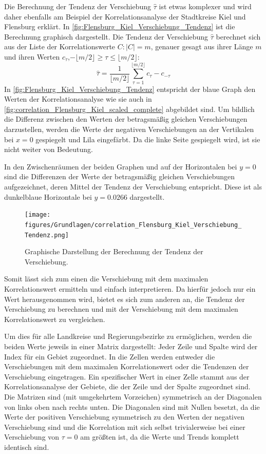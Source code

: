 Die Berechnung der Tendenz der Verschiebung $\hat{\tau}$ ist etwas komplexer und wird daher ebenfalls am Beispiel der Korrelationsanalyse der Stadtkreise Kiel und Flensburg erklärt.
In \autoref{fig:Flensburg_Kiel_Verschiebung_Tendenz} ist die Berechnung graphisch dargestellt.
Die Tendenz der Verschiebung $\hat{\tau}$ berechnet sich aus der Liste der Korrelationswerte $C:\vert C\vert =m$, genauer gesagt aus ihrer Länge $m$ und ihren Werten $c_\tau$,$ -\lfloor m/2 \rfloor\geq \tau\leq \lfloor m/2 \rfloor$:
\begin{equation}\label{eq:Tendenz der Verschiebung}
    \hat{\tau} = \frac{1}{\lfloor m/2 \rfloor}
    \sum_{\tau=1}^{\lfloor m/2 \rfloor}c_{\tau}-c_{-\tau}
\end{equation}
\newpage
In \autoref{fig:Flensburg_Kiel_Verschiebung_Tendenz} entspricht der blaue Graph den Werten der Korrelationsanalyse wie sie auch in \autoref{fig:correlation_Flensburg_Kiel_scaled_complete} abgebildet sind. Um bildlich die Differenz zwischen den Werten der betragsmäßig gleichen Verschiebungen darzustellen, werden die Werte der negativen Verschiebungen an der Vertikalen bei $x=0$ gespiegelt und Lila eingefärbt.
Da die linke Seite gespiegelt wird, ist sie nicht weiter von Bedeutung.

In den Zwischenräumen der beiden Graphen und auf der Horizontalen bei $y=0$ sind die Differenzen der Werte der betragsmäßig gleichen Verschiebungen aufgezeichnet, deren Mittel der Tendenz der Verschiebung entspricht. Diese ist als dunkelblaue Horizontale bei $y=0.0266$ dargestellt.

\begin{figure}[H]
    \centering
    \texttt{[image: figures/Grundlagen/correlation\_Flensburg\_Kiel\_Verschiebung\_Tendenz.png]}
    \caption{Graphische Darstellung der Berechnung der Tendenz der Verschiebung.}
    \label{fig:Flensburg_Kiel_Verschiebung_Tendenz}
\end{figure}

Somit lässt sich zum einen die Verschiebung mit dem maximalen Korrelationswert ermitteln und einfach interpretieren.
Da hierfür jedoch nur ein Wert herausgenommen wird, bietet es sich zum anderen an, die Tendenz der Verschiebung zu berechnen und mit der Verschiebung mit dem maximalen Korrelationswert zu vergleichen.



Um dies für alle Landkreise und Regierungsbezirke zu ermöglichen, werden die beiden Werte jeweils in einer Matrix dargestellt: Jeder Zeile und Spalte wird der Index für ein Gebiet zugeordnet. In die Zellen werden entweder die Verschiebungen mit dem maximalen Korrelationswert oder die Tendenzen der Verschiebung eingetragen. Ein spezifischer Wert in einer Zelle stammt aus der Korrelationsanalyse der Gebiete, die der Zeile und der Spalte zugeordnet sind.
Die Matrizen sind (mit umgekehrtem Vorzeichen) symmetrisch an der Diagonalen von links oben nach rechts unten. Die Diagonalen sind mit Nullen besetzt, da die Werte der positiven Verschiebung symmetrisch zu den Werten der negativen Verschiebung sind und die Korrelation mit sich selbst trivialerweise bei einer Verschiebung von $\tau=0$ am größten ist, da die Werte und Trends komplett identisch sind.

